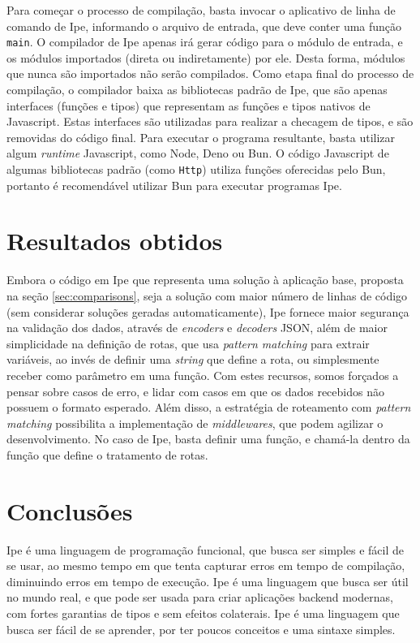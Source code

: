 \documentclass[12pt]{article}
\begin{document}
Para começar o processo de compilação, basta invocar o aplicativo de linha de comando de Ipe,
informando o arquivo de entrada, que deve conter uma função \texttt{main}. O compilador de Ipe apenas
irá gerar código para o módulo de entrada, e os módulos importados (direta ou indiretamente) por ele.
Desta forma, módulos que nunca são importados não serão compilados. Como etapa final do processo de
compilação, o compilador baixa as bibliotecas padrão de Ipe, que são apenas interfaces (funções e tipos)
que representam as funções e tipos nativos de Javascript. Estas interfaces são utilizadas para
realizar a checagem de tipos, e são removidas do código final. Para executar o programa resultante,
basta utilizar algum \textit{runtime} Javascript, como Node, Deno ou Bun. O código Javascript
de algumas bibliotecas padrão (como \texttt{Http}) utiliza funções oferecidas pelo Bun, portanto
é recomendável utilizar Bun para executar programas Ipe.

\section{Resultados obtidos}

Embora o código em Ipe que representa uma solução à aplicação base, proposta na seção \ref{sec:comparisons},
seja a solução com maior número de linhas de código (sem considerar soluções geradas automaticamente),
Ipe fornece maior segurança na validação dos dados, através de \textit{encoders} e \textit{decoders}
JSON, além de maior simplicidade na definição de rotas, que usa \textit{pattern matching} para extrair
variáveis, ao invés de definir uma \textit{string} que define a rota, ou simplesmente receber como
parâmetro em uma função. Com estes recursos, somos forçados a pensar sobre casos de erro, e lidar com
casos em que os dados recebidos não possuem o formato esperado. Além disso, a estratégia de roteamento
com \textit{pattern matching} possibilita a implementação de \textit{middlewares}, que podem agilizar
o desenvolvimento. No caso de Ipe, basta definir uma função, e chamá-la dentro da função que define
o tratamento de rotas.

\section{Conclusões}

Ipe é uma linguagem de programação funcional, que busca ser simples e fácil de se usar, ao mesmo
tempo em que tenta capturar erros em tempo de compilação, diminuindo erros em tempo de execução. Ipe
é uma linguagem que busca ser útil no mundo real, e que pode ser usada para criar aplicações backend
modernas, com fortes garantias de tipos e sem efeitos colaterais. Ipe é uma linguagem que busca ser
fácil de se aprender, por ter poucos conceitos e uma sintaxe simples.
\end{document}
